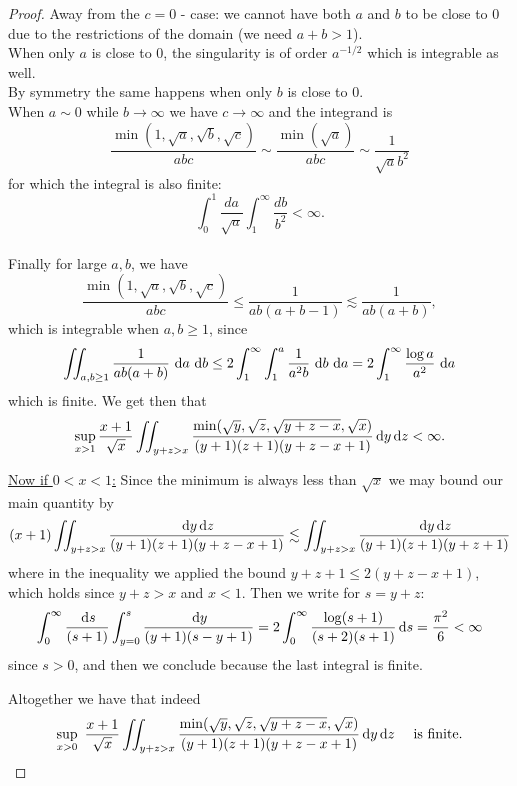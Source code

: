 \documentclass[reqno,11pt,letterpaper]{amsart}
\numberwithin{equation}{section}
\newcommand{\dd}{\, {\rm d}}
\begin{document}
\begin{proof}
Away from the $c=0$ - case: we cannot have both $a$ and $b$ to be close to $0$ due to the restrictions of the domain (we need $a+b>1$). \\
When only $a$ is close to $0$, the singularity is of order $a^{-1/2}$ which is integrable as well.\\
By symmetry the same happens when only $b$ is close to $0$.\\
When $a\sim 0$ while $b \to \infty$ we have $c \to \infty$ and the integrand is
$$ \frac{
\min(1,\sqrt a,\sqrt b,\sqrt c)
}
{abc} \sim \frac{\min(\sqrt{a})}{abc} \sim \frac{1}{\sqrt{a}b^2}$$
for which the integral is also finite: $$ \int_0^1 \frac{da}{\sqrt{a}}  \int_1^\infty \frac{db}{b^2} <\infty. $$
\\
Finally for large $a,b$, we have 
$$
\frac{
\min(1,\sqrt a,\sqrt b,\sqrt c)
}
{abc}
\le
\frac{1}{ab(a+b-1)}
\lesssim
\frac{1}{ab(a+b)}, 
$$
which is integrable when $a,b\ge 1$,  since $$ \iint_{a,b\ge 1}\frac{1}{ab(a+b)}\,\dd a\,\dd b
\le
2\int_1^\infty\int_1^a \frac{1}{a^2b}\,\dd b\,\dd a =
2\int_1^\infty \frac{\log a}{a^2}\,\dd a $$ 
which is finite. We get then that 
$$
\sup_{x >1} \frac{x+1}{\sqrt{x}} 
 \iint_{y+z > x} \frac{\min (\sqrt{y}, \sqrt{z}, \sqrt{y+z-x}, \sqrt{x})}{(y+1)(z+1)(y+z-x+1)} \dd y \dd z < \infty.
 $$
 
\underline{Now if $0<x<1$:} Since the minimum is always less than $\sqrt{x}$ we may bound our main quantity by 
$$ 
(x+1) 
 \iint_{y+z > x} \frac{\dd y  \dd z }{(y+1)(z+1)(y+z-x+1)}
 \lesssim \iint_{y+z > x} \frac{\dd y \dd z }{(y+1)(z+1)(y+z+1)}
$$
where in the inequality we applied the bound $y+z+1\leq 2 (y+z-x+1)$, which holds since $y+z>x$ and $x<1$. Then we write for $s=y+z$:
$$ \int_{0}^{\infty} \frac{\dd s}{(s+1)} \int_{y=0}^s \frac{\dd y }{(y+1)(s-y+1)}  = 2 \int_{0}^{\infty} \frac{\log(s+1)}{(s+2)(s+1)} \dd s  = \frac{\pi^2}{6}<\infty
$$ since $s>0$, and then we conclude because the last integral is finite. 

Altogether we have that indeed $$\sup_{x >0}\ \frac{x+1}{\sqrt{x}} 
 \iint_{y+z > x} \frac{\min (\sqrt{y}, \sqrt{z}, \sqrt{y+z-x}, \sqrt{x})}{(y+1)(z+1)(y+z-x+1)} \dd y \dd z \quad \text{ is finite}. $$
 

\end{proof}
\end{document}

